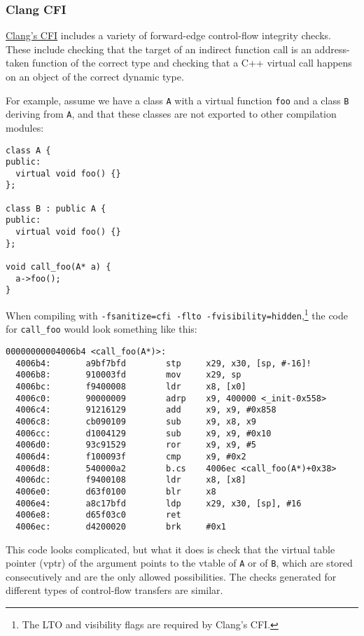 \documentclass[a4paper,]{report}
\begin{document}
\hypertarget{clang-cfi}{%
\subsubsection{Clang CFI}\label{clang-cfi}}

\href{https://clang.llvm.org/docs/ControlFlowIntegrity.html}{Clang's
CFI} includes a variety of forward-edge control-flow integrity checks.
These include checking that the target of an indirect function call is
an address-taken function of the correct type and checking that a C++
 virtual call happens on an object of the correct dynamic
type.

For example, assume we have a class \texttt{A} with a virtual function
\texttt{foo} and a class \texttt{B} deriving from \texttt{A}, and that
these classes are not exported to other compilation modules:

\begin{verbatim}
class A {
public:
  virtual void foo() {}
};

class B : public A {
public:
  virtual void foo() {}
};

void call_foo(A* a) {
  a->foo();
}
\end{verbatim}

When compiling with
\texttt{-fsanitize=cfi\ -flto\ -fvisibility=hidden},\footnote{The LTO
  and visibility flags are required by Clang's CFI.} the code for
\texttt{call\_foo} would look something like this:

\begin{verbatim}
00000000004006b4 <call_foo(A*)>:
  4006b4:       a9bf7bfd        stp     x29, x30, [sp, #-16]!
  4006b8:       910003fd        mov     x29, sp
  4006bc:       f9400008        ldr     x8, [x0]
  4006c0:       90000009        adrp    x9, 400000 <_init-0x558>
  4006c4:       91216129        add     x9, x9, #0x858
  4006c8:       cb090109        sub     x9, x8, x9
  4006cc:       d1004129        sub     x9, x9, #0x10
  4006d0:       93c91529        ror     x9, x9, #5
  4006d4:       f100093f        cmp     x9, #0x2
  4006d8:       540000a2        b.cs    4006ec <call_foo(A*)+0x38>
  4006dc:       f9400108        ldr     x8, [x8]
  4006e0:       d63f0100        blr     x8
  4006e4:       a8c17bfd        ldp     x29, x30, [sp], #16
  4006e8:       d65f03c0        ret
  4006ec:       d4200020        brk     #0x1
\end{verbatim}

This code looks complicated, but what it does is check that the virtual
table pointer (vptr) of the argument points to the vtable of \texttt{A}
or of \texttt{B}, which are stored consecutively and are the only
allowed possibilities. The checks generated for different types of
control-flow transfers are similar.
\end{document}
